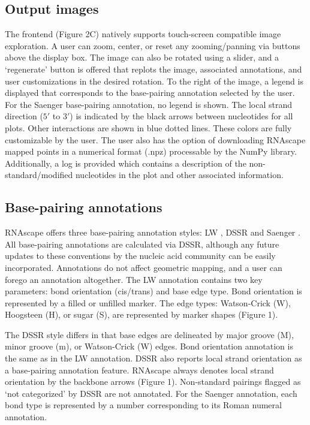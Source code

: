 \subsection{Output images}

The frontend (Figure 2C) natively supports touch-screen compatible image exploration. A user can zoom, center, or reset any zooming/panning via buttons above the display box. The image can also be rotated using a slider, and a ‘regenerate’ button is offered that replots the image, associated annotations, and user customizations in the desired rotation. To the right of the image, a legend is displayed that corresponds to the base-pairing annotation selected by the user. For the Saenger \citep{Saenger1984} base-pairing annotation, no legend is shown. The local strand direction ($5'$ to $3'$) is indicated by the black arrows between nucleotides for all plots. Other interactions are shown in blue dotted lines. These colors are fully customizable by the user. The user also has the option of downloading RNAscape mapped points in a numerical format (.npz) processable by the NumPy \citep{harris2020array} library. Additionally, a log is provided which contains a description of the non-standard/modified nucleotides in the plot and other associated information.

\subsection{Base-pairing annotations}

RNAscape offers three base-pairing annotation styles: LW \citep{Yang2003, Leontis2001}, DSSR \citep{lu2015dssr} and Saenger \citep{Saenger1984}. All base-pairing annotations are calculated via DSSR, although any future updates to these conventions by the nucleic acid community can be easily incorporated. Annotations do not affect geometric mapping, and a user can forego an annotation altogether. The LW annotation contains two key parameters: bond orientation (cis/trans) and base edge type. Bond orientation is represented by a filled or unfilled marker. The edge types: Watson-Crick (W), Hoogsteen (H), or sugar (S), are represented by marker shapes (Figure 1).

The DSSR style differs in that base edges are delineated by major groove (M), minor groove (m), or Watson-Crick (W) edges. Bond orientation annotation is the same as in the LW \citep{Yang2003, Leontis2001} annotation. DSSR also reports local strand orientation as a base-pairing annotation feature. RNAscape always denotes local strand orientation by the backbone arrows (Figure 1). Non-standard pairings flagged as ‘not categorized’ by DSSR are not annotated. For the Saenger \citep{Saenger1984} annotation, each bond type is represented by a number corresponding to its Roman numeral annotation.

